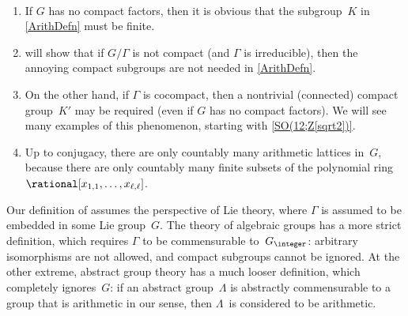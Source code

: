 \begin{rems} \label{ArithDefnRem} \ 
\noprelistbreak
	\begin{enumerate}
	\item \label{ArithDefnRem-noK}
	If $G$ has no compact factors, then it is obvious that the subgroup~$K$ in \cref{ArithDefn} must be finite. 

	\item {} will show that if $G/\Gamma$ is not compact (and $\Gamma$ is irreducible), then the annoying compact subgroups are not needed in \cref{ArithDefn}.

	\item On the other hand, if $\Gamma$ is cocompact, then a nontrivial
(connected) compact group~$K'$ may be required (even if $G$
has no compact factors). We will see many examples of this
phenomenon, starting with \cref{SO(12;Z[sqrt2])}.

	\item  Up to conjugacy, there are only countably many arithmetic
lattices in~$G$, because there are only countably many
finite subsets of the polynomial ring $\rational[x_{1,1},\ldots,x_{\ell,\ell}]$.

	\end{enumerate}
 \end{rems}

\begin{terminology}
 Our definition of  assumes the perspective of Lie theory, where $\Gamma$ is assumed
to be embedded in some Lie group~$G$. The theory of algebraic groups
has a more strict definition, which requires
$\Gamma$ to be commensurable to~$G_{\integer}$: arbitrary
isomorphisms are not allowed, and compact subgroups cannot
be ignored. At the other extreme, abstract group theory 
has a much looser definition, which completely ignores~$G$:
if an abstract group~$\Lambda$ is abstractly commensurable to a
group that is arithmetic in our sense, then $\Lambda$~is considered to be arithmetic.
 \end{terminology}

